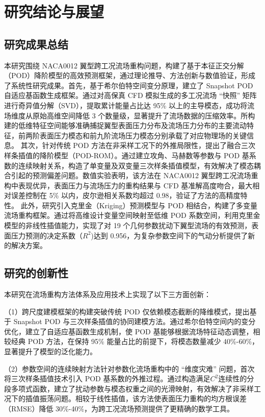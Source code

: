 \chapter{研究结论与展望}
\section{研究成果总结}
本研究围绕 NACA0012 翼型跨工况流场重构问题，构建了基于本征正交分解（POD）降阶模型的高效预测框架，通过理论推导、方法创新与数值验证，形成了系统性研究成果。首先，基于希尔伯特空间变分原理，建立了 Snapshot POD 自适应基函数生成框架。通过对高保真 CFD 模拟生成的多工况流场 “快照” 矩阵进行奇异值分解（SVD），提取累计能量占比达 95\% 以上的主导模态，成功将流场维度从原始高维空间降低 3 个数量级，显著提升了流场数据的压缩效率。所构建的低维特征空间能够准确捕捉翼型表面压力分布及流场压力分布的主要流动特征，前两阶表面压力模态和前九阶流场压力模态分别承载了对应物理场的关键信息。
其次，针对传统 POD 方法在非采样工况下的外推局限性，提出了融合三次样条插值的降阶模型（POD-ROM）。通过建立攻角、马赫数等参数与 POD 基系数的连续映射关系，构造了单变量及双变量三次样条插值模型，有效解决了模态耦合引起的预测偏差问题。数值实验表明，该方法在 NACA0012 翼型跨工况流场重构中表现优异，表面压力与流场压力的重构结果与 CFD 基准解高度吻合，最大相对误差控制在 5\% 以内，皮尔逊相关系数均超过 0.98，验证了方法的高精度特性。
此外，研究引入克里金（Kriging）预测模型与 POD 相结合，构建了多变量流场重构框架。通过将高维设计变量空间映射至低维 POD 系数空间，利用克里金模型的非线性插值能力，实现了对 19 个几何参数扰动下翼型流场的有效预测，表面压力预测的决定系数（$R^2$)达到 0.956，为复杂参数空间下的气动分析提供了新的解决方案。


\section{研究的创新性}
本研究在流场重构方法体系及应用技术上实现了以下三方面创新：

（1）跨尺度建模框架的构建突破传统 POD 仅依赖模态截断的降维模式，提出基于 Snapshot POD 与三次样条插值的协同建模方法。通过希尔伯特空间内的变分优化，建立了自适应基函数生成机制，使 POD 基能够根据流场特征动态调整，相较经典 POD 方法，在保持 95\% 能量占比的前提下，将模态数量减少 40\%-60\%，显著提升了模型的泛化能力。

（2）参数空间的连续映射方法针对参数化流场重构中的 “维度灾难” 问题，首次将三次样条插值技术引入 POD 基系数的外推过程。通过构造满足$C^2$连续性的分段多项式函数，建立了扰动参数与模态权重之间的光滑映射，有效解决了非采样工况下的插值振荡问题。相较于线性插值，该方法使表面压力重构的均方根误差（RMSE）降低 30\%-40\%，为跨工况流场预测提供了更精确的数学工具。​

